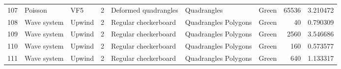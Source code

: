\begin{tabular}{lllrlllrr}
107 &           Poisson &                            VF5 &               2 &                      Deformed quadrangles &            Quadrangles  &                                Green &                    65536 &                         3.210472 \\
108 &       Wave system &                         Upwind &               2 &                      Regular checkerboard &   Quadrangles Polygons  &                                Green &                       40 &                         0.790309 \\
109 &       Wave system &                         Upwind &               2 &                      Regular checkerboard &   Quadrangles Polygons  &                                Green &                     2560 &                         3.546686 \\
110 &       Wave system &                         Upwind &               2 &                      Regular checkerboard &   Quadrangles Polygons  &                                Green &                      160 &                         0.573577 \\
111 &       Wave system &                         Upwind &               2 &                      Regular checkerboard &   Quadrangles Polygons  &                                Green &                      640 &                         1.133317 \\
\bottomrule
\end{tabular}
